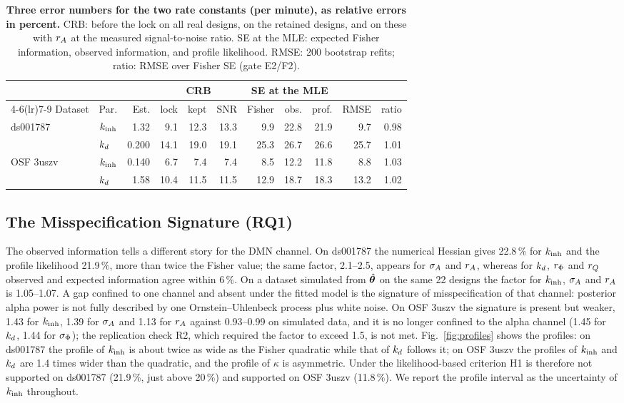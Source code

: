 \begin{table}[t]
\caption{\textbf{Three error numbers for the two rate constants (per minute), as relative errors in percent.} CRB: before the lock on all real designs, on the retained designs, and on these with $r_{A}$ at the measured signal-to-noise ratio. SE at the MLE: expected Fisher information, observed information, and profile likelihood. RMSE: 200 bootstrap refits; ratio: RMSE over Fisher SE (gate E2/F2).}
\label{tab:errors}
\centering\scriptsize
\setlength{\tabcolsep}{2.2pt}
\begin{tabular}{llrrrrrrrrr}
\toprule
 & & & \multicolumn{3}{c}{CRB} & \multicolumn{3}{c}{SE at the MLE} & & \\
\cmidrule(lr){4-6}\cmidrule(lr){7-9}
Dataset & Par. & Est. & lock & kept & SNR & Fisher & obs. & prof. & RMSE & ratio \\
\midrule
ds001787  & $k_{\mathrm{inh}}$ & 1.32  & 9.1  & 12.3 & 13.3 & 9.9  & 22.8 & 21.9 & 9.7  & 0.98 \\
          & $k_{d}$   & 0.200 & 14.1 & 19.0 & 19.1 & 25.3 & 26.7 & 26.6 & 25.7 & 1.01 \\
OSF 3uszv & $k_{\mathrm{inh}}$ & 0.140 & 6.7  & 7.4  & 7.4  & 8.5  & 12.2 & 11.8 & 8.8  & 1.03 \\
          & $k_{d}$   & 1.58  & 10.4 & 11.5 & 11.5 & 12.9 & 18.7 & 18.3 & 13.2 & 1.02 \\
\bottomrule
\end{tabular}
\end{table}

\subsection{The Misspecification Signature (RQ1)}
The observed information tells a different story for the DMN channel. On ds001787 the numerical Hessian gives 22.8\,\% for $k_{\mathrm{inh}}$ and the profile likelihood 21.9\,\%, more than twice the Fisher value; the same factor, 2.1--2.5, appears for $\sigma_{A}$ and $r_{A}$, whereas for $k_{d}$, $r_{\Phi}$ and $r_{Q}$ observed and expected information agree within 6\,\%. On a dataset simulated from $\hat{\boldsymbol{\theta}}$ on the same 22 designs the factor for $k_{\mathrm{inh}}$, $\sigma_{A}$ and $r_{A}$ is 1.05--1.07. A gap confined to one channel and absent under the fitted model is the signature of misspecification of that channel: posterior alpha power is not fully described by one Ornstein--Uhlenbeck process plus white noise. On OSF 3uszv the signature is present but weaker, 1.43 for $k_{\mathrm{inh}}$, 1.39 for $\sigma_{A}$ and 1.13 for $r_{A}$ against 0.93--0.99 on simulated data, and it is no longer confined to the alpha channel (1.45 for $k_{d}$, 1.44 for $\sigma_{\Phi}$); the replication check R2, which required the factor to exceed 1.5, is not met. Fig.~\ref{fig:profiles} shows the profiles: on ds001787 the profile of $k_{\mathrm{inh}}$ is about twice as wide as the Fisher quadratic while that of $k_{d}$ follows it; on OSF 3uszv the profiles of $k_{\mathrm{inh}}$ and $k_{d}$ are 1.4 times wider than the quadratic, and the profile of $\kappa$ is asymmetric. Under the likelihood-based criterion H1 is therefore not supported on ds001787 (21.9\,\%, just above 20\,\%) and supported on OSF 3uszv (11.8\,\%). We report the profile interval as the uncertainty of $k_{\mathrm{inh}}$ throughout.

